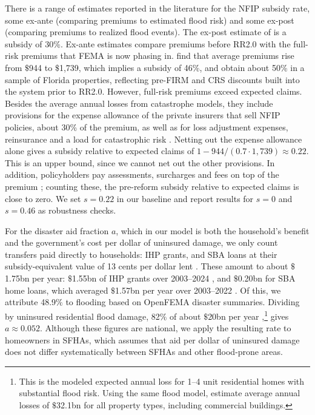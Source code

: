 \documentclass[12pt]{article}
\begin{document}
There is a range of estimates reported in the literature for the NFIP subsidy rate, some ex-ante (comparing premiums to estimated flood risk) and some ex-post (comparing premiums to realized flood events). The ex-post estimate of \cite{wagner2022adaptation} is a subsidy of 30\%. Ex-ante estimates compare premiums before RR2.0 with the full-risk premiums that FEMA is now phasing in. \cite{gruber2026optimal} find that average premiums rise from $\$$944 to $\$$1,739, which implies a subsidy of 46\%, and \cite{bakkensen2020sorting} obtain about 50\% in a sample of Florida properties, reflecting pre-FIRM and CRS discounts built into the system prior to RR2.0. However, full-risk premiums exceed expected claims. Besides the average annual losses from catastrophe models, they include provisions for the expense allowance of the private insurers that sell NFIP policies, about 30\% of the premium, as well as for loss adjustment expenses, reinsurance and a load for catastrophic risk \citep{gao2023flood}. Netting out the expense allowance alone gives a subsidy relative to expected claims of $1-944/(0.7\cdot1{,}739)\approx0.22$. This is an upper bound, since we cannot net out the other provisions. In addition, policyholders pay assessments, surcharges and fees on top of the premium \citep{gao2023flood}; counting these, the pre-reform subsidy relative to expected claims is close to zero. We set $s=0.22$ in our baseline and report results for $s=0$ and $s=0.46$ as robustness checks.

For the disaster aid fraction $a$, which in our model is both the household's benefit and the government's cost per dollar of uninsured damage, we only count transfers paid directly to households: IHP grants, and SBA loans at their subsidy-equivalent value of 13 cents per dollar lent \citep{gruber2026optimal}. These amount to about $\$$1.75bn per year: $\$$1.55bn of IHP grants over 2003--2024 \citep{crs2025ihpfaq}, and $\$$0.20bn for SBA home loans, which averaged $\$$1.57bn per year over 2003--2022 \citep{sba2022disaster}. Of this, we attribute 48.9$\%$ to flooding based on OpenFEMA disaster summaries. Dividing by uninsured residential flood damage, 82$\%$ of about $\$$20bn per year \citep{firststreet2021cost},\footnote{This is the modeled expected annual loss for 1--4 unit residential homes with substantial flood risk. Using the same flood model, \cite{wing2022inequitable} estimate average annual losses of $\$$32.1bn for all property types, including commercial buildings.} gives $a\approx0.052$. Although these figures are national, we apply the resulting rate to homeowners in SFHAs, which assumes that aid per dollar of uninsured damage does not differ systematically between SFHAs and other flood-prone areas.
\end{document}
